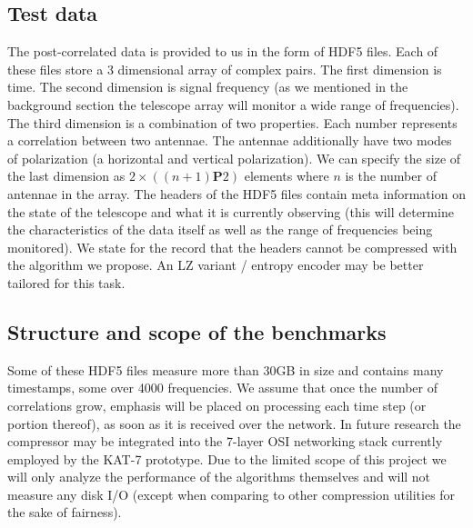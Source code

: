 \subsection{Test data}
The post-correlated data is provided to us in the form of HDF5 files. Each of these files store a 3 dimensional array of complex pairs. The first dimension is time. The second dimension is signal frequency (as we mentioned
in the background section the telescope array will monitor a wide range of frequencies). The third dimension is a combination of two properties. Each number represents a correlation between two antennae. The antennae additionally
have two modes of polarization (a horizontal and vertical polarization). We can specify the size of the last dimension as $2\times((n+1)\mathbf{P}2)$ elements where $n$ is the number of
antennae in the array. The headers of the HDF5 files contain meta information on the state of the telescope and what it is currently observing (this will determine the characteristics of the data itself as well as 
the range of frequencies being monitored). We state for the record that the headers cannot be compressed with the algorithm we propose. An LZ variant / entropy encoder may be better tailored for this task.
\subsection{Structure and scope of the benchmarks}
Some of these HDF5 files measure more than 30GB in size and contains many timestamps, some over 4000 frequencies. We assume that once the number of correlations grow, emphasis will be placed on processing each 
time step (or portion thereof), as soon as it is received over the network. In future research the compressor may be integrated into the 7-layer OSI networking stack currently employed by the KAT-7 prototype. Due to the limited
scope of this project we will only analyze the performance of the algorithms themselves and will not measure any disk I/O (except when comparing to other compression utilities for the sake of fairness).

